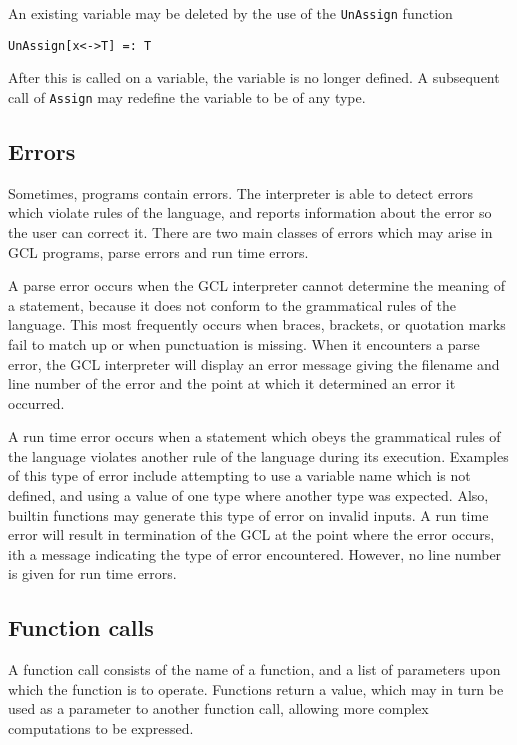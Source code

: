 An existing variable may be deleted by the use of the {\tt UnAssign} function

\begin{verbatim}
UnAssign[x<->T] =: T
\end{verbatim}

\noindent After this is called on a variable, the variable is no longer
defined.  A subsequent call of {\tt Assign} may redefine the variable to
be of any type.

\subsection{Errors}

Sometimes, programs contain errors.  The interpreter is able to detect
errors which violate rules of the language, and reports information
about the error so the user can correct it.  There are two main
classes of errors which may arise in GCL programs, parse errors and
run time errors.

A parse error occurs when the GCL interpreter cannot determine the
meaning of a statement, because it does not conform to the grammatical
rules of the language.  This most frequently occurs when braces,
brackets, or quotation marks fail to match up or when punctuation is
missing.  When it encounters a parse error, the GCL interpreter will
display an error message giving the filename and line number of the
error and the point at which it determined an error it occurred.

A run time error occurs when a statement which obeys the grammatical
rules of the language violates another rule of the language during its
execution.  Examples of this type of error include attempting to use a
variable name which is not defined, and using a value of one type
where another type was expected.  Also, builtin functions may generate
this type of error on invalid inputs.  A run time error will result in
termination of the GCL at the point where the error occurs, ith a
message indicating the type of error encountered.  However, no line
number is given for run time errors.  


\subsection{Function calls}

A function call consists of the name of a function, and a list of
parameters upon which the function is to operate.  Functions return a
value, which may in turn be used as a parameter to another function
call, allowing more complex computations to be expressed.

